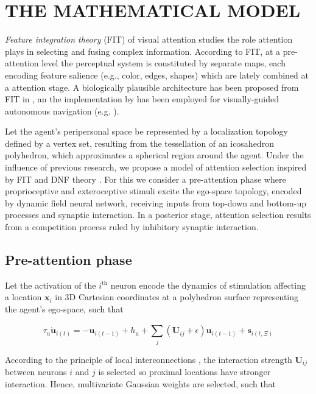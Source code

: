 \documentclass[letterpaper, 10 pt, conference]{ieeeconf}  %
\begin{document}
	
	\section{THE MATHEMATICAL MODEL}	
	\label{sec:model}
	
	\textit{Feature integration theory} (FIT) \cite{treisman1980} of visual attention studies the role attention plays in selecting and fusing complex information. According to FIT, at a pre-attention level the perceptual system is constituted by separate maps, each encoding feature salience (e.g., color, edges, shapes) which are lately combined at a attention stage. A biologically plausible architecture has been proposed from FIT in \cite{koch1985}, an the implementation by \cite{itti1998} has been employed for visually-guided autonomous navigation (e.g. \cite{siagian2014}).

	Let the agent's peripersonal space be represented by a localization topology defined by a vertex set, resulting from the tessellation of an icosahedron polyhedron, which approximates a spherical region around the agent. Under the influence of previous research, we propose a model of attention selection inspired by FIT and DNF theory \cite{amari1977}. For this we consider a pre-attention phase where proprioceptive and exteroceptive stimuli excite the ego-space topology, encoded by dynamic field neural network, receiving inputs from top-down and bottom-up processes and synaptic interaction. In a posterior stage, attention selection results from a competition process ruled by inhibitory synaptic interaction.
	
	\subsection{Pre-attention phase}
	Let the activation of the $i^\mathrm{th}$ neuron encode the dynamics of stimulation affecting a location  $\mathbf{x}_i$ in 3D Cartesian coordinates at a polyhedron surface representing the agent's ego-space, such that 
		
	\begin{equation}
	\tau_\mathrm{u} \dot{\mathbf{u}}_{i(t)} = -\mathbf{u}_{i(t-1)} + h_\mathrm{u} + \sum_{j}^{} (\mathbf{U}_{ij}+\epsilon)\mathbf{u}_{i(t-1)} + \mathbf{s}_{i(t,\Xi)} 
	\label{eq:pre-sel}
	\end{equation}

	According to the principle of local interconnections \cite{samsonovich97}, the interaction strength $\mathbf{U}_{ij}$ between neurons $i$ and $j$ is selected so proximal locations have stronger interaction. Hence, multivariate Gaussian weights are selected, such that
	
\end{document}
